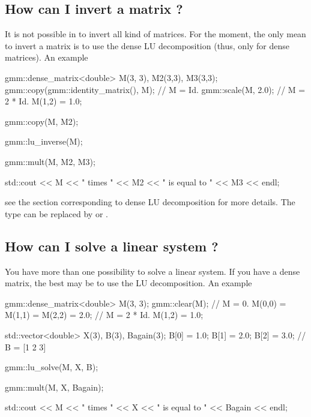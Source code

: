 \documentclass[11pt,a4paper]{article}
\begin{document}
\subsection{How can I invert a matrix ?}
It is not possible in \gmm to invert all kind of matrices. For the moment, the only mean to invert a matrix is to use the dense LU decomposition (thus, only for dense matrices). An example
\begin{cppcode}
  gmm::dense_matrix<double> M(3, 3), M2(3,3), M3(3,3);
  gmm::copy(gmm::identity_matrix(), M);  // M = Id.
  gmm::scale(M, 2.0);                    // M = 2 * Id.
  M(1,2) = 1.0;

  gmm::copy(M, M2);  
 
  gmm::lu_inverse(M);

  gmm::mult(M, M2, M3);

  std::cout << M << " times " << M2 << " is equal to " << M3 << endl;
\end{cppcode}
see the section corresponding to dense LU decomposition for more details. The type  can be replaced by  or .

\subsection{How can I solve a linear system ?}
You have more than one possibility to solve a linear system. If you have a dense matrix, the best may be to use the LU decomposition. An example
\begin{cppcode}
  gmm::dense_matrix<double> M(3, 3);
  gmm::clear(M);                  // M = 0.
  M(0,0) = M(1,1) = M(2,2) = 2.0; // M = 2 * Id.
  M(1,2) = 1.0;

  std::vector<double> X(3), B(3), Bagain(3);
  B[0] = 1.0; B[1] = 2.0; B[2] = 3.0;  // B = [1 2 3]
 
  gmm::lu_solve(M, X, B);

  gmm::mult(M, X, Bagain);

  std::cout << M << " times " << X << " is equal to " << Bagain << endl;
\end{cppcode}
\end{document}

